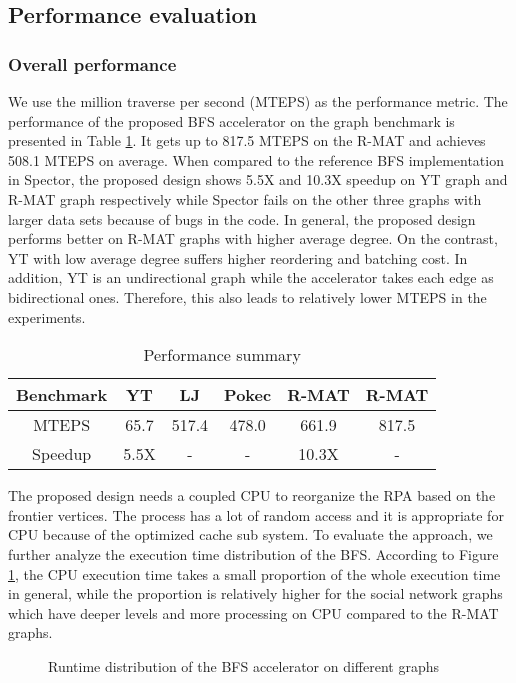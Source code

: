 \subsection{Performance evaluation}
\subsubsection{Overall performance}
We use the million traverse per second (MTEPS) as 
the performance metric. The performance of the proposed BFS 
accelerator on the graph benchmark is 
presented in Table \ref{tab:performance-summary}. 
It gets up to 817.5 MTEPS on the R-MAT\uppercase\expandafter{}
and achieves 508.1 MTEPS on average. When compared to the reference BFS 
implementation in Spector, the proposed design shows 5.5X and 10.3X 
speedup on YT graph and R-MAT\uppercase\expandafter{} 
graph respectively while Spector fails on the other three graphs with larger data sets 
because of bugs in the code. In general, the proposed design performs better on 
R-MAT graphs with higher average degree. On the contrast, YT with 
low average degree suffers higher reordering and batching cost. In addition, 
YT is an undirectional graph while the accelerator takes each edge as bidirectional ones. 
Therefore, this also leads to relatively lower MTEPS in the experiments. 
\begin{table}
    \centering
  \caption{Performance summary}
  \label{tab:performance-summary}
  \begin{tabular}{cccccc}
    \toprule
      Benchmark & YT & LJ & Pokec & R-MAT\uppercase\expandafter{\romannumeral1} & R-MAT\uppercase\expandafter{\romannumeral2} \\
    \midrule
      MTEPS & 65.7 & 517.4 & 478.0 & 661.9 & 817.5 \\
      Speedup & 5.5X & - & - & 10.3X & - \\
  \bottomrule
\end{tabular}
\vspace{-1em}
\end{table}

The proposed design needs a coupled CPU to reorganize the RPA based on the frontier vertices.
The process has a lot of random access and it is appropriate for CPU because 
of the optimized cache sub system. To evaluate the approach, we further analyze the 
execution time distribution of the BFS. According to Figure \ref{fig:runtime}, the CPU execution time 
takes a small proportion of the whole execution time in general, while the proportion is relatively 
higher for the social network graphs which have deeper levels and more processing on CPU 
compared to the R-MAT graphs. 
\begin{figure}
    \caption{Runtime distribution of the BFS accelerator on different graphs}
\label{fig:runtime}
\vspace{-1em}
\end{figure}

